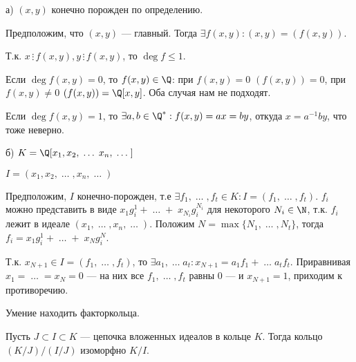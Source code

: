 \begin{solution}

а) $(x, y)$ конечно порожден по определению.

Предположим, что $(x,y)$ --- главный. Тогда $\exists f(x, y): (x, y) = (f(x,y))$.

Т.к. $x \,\vdots\, f (x, y),  y \,\vdots\, f(x, y) $, то $\deg f \leq 1$.

Если $\deg f(x, y) = 0$, то $f(x, y) \in \Q$: при $f(x, y) = 0$ $(f(x, y)) = 0$, при $f(x, y) \neq 0$ $(f(x,y)) = \Q[x, y]$. Оба случая нам не подходят.

Если $\deg f(x, y) = 1$, то $\exists a, b\in \Q^*: f(x, y) = ax = by$, откуда $x = a^{-1} b y$, что тоже неверно.

б) $K = \Q[x_1, x_2, \;\ldots\; x_n, \; \ldots \;]$

$I = (x_1, x_2, \;\ldots\;, x_n, \;\ldots\;)$

Предположим, $I$ конечно-порожден, т.е $\exists f_1, \;\ldots\;, f_t \in K: I = (f_1, \;\ldots\;, f_t)$. $f_i$ можно представить в виде $x_1 g^1_{i} + \;\ldots\; + \; x_{N_i} g^{N_i}_{i}$ для некоторого $N_i \in \N$, т.к. $f_i$ лежит в идеале $(x_1,  \;\ldots\;, x_n,  \;\ldots\;)$. Положим $N = \max \{N_1, \;\ldots\;, N_t \}$, тогда $f_i = x_1 g^1_{i} + \;\ldots\; + \; x_{N} g^{N}_{i} $.

Т.к. $x_{N+1} \in I = (f_1, \;\ldots\;, f_t )$, то $\exists a_1, \;\ldots\; a_t : x_{N+1} = a_1 f_1 + \;\ldots\; a_t f_t$. Приравнивая $x_1 = \;\ldots\; = x_N = 0$ --- на них все $f_1, \;\ldots\;, f_t$ равны 0 --- и $x_{N+1} = 1$, приходим к противоречию.
 
\end{solution}


\begin{problem}[17 (4.3)]

Умение находить факторкольца.

\end{problem}


\begin{problem}[18 (4.8)]

Пусть $J \subset I \subset K$ — цепочка вложенных идеалов в кольце $K$. Тогда кольцо $(K/J)/(I/J)$ изоморфно $K/I$.

\end{problem}

